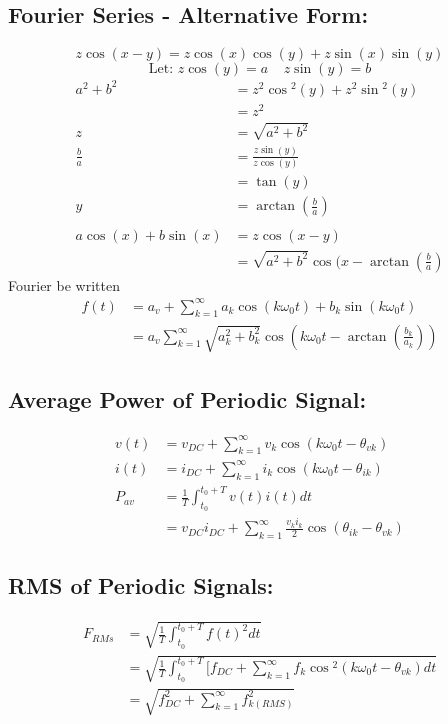 \documentclass[a5paper]{article}
\begin{document}
	\subsection{Fourier Series - Alternative Form:}
	$$z\cos{(x-y)}=z\cos{(x)}\cos{(y)}+z\sin{(x)}\sin{(y)}$$
	$$\text{Let: }z\cos{(y)}=a \;\;\;\; z\sin{(y)}=b$$
	\begin{align*}
		a^{2}+b^{2}&=z^{2}\cos{^{2}(y)}+z^{2}\sin{^{2}(y)}\\
		&=z^{2}\\
		z&=\sqrt{a^{2}+b^{2}}\\
		\frac{b}{a}&=\frac{z\sin{(y)}}{z\cos{(y)}}\\
		&=\tan{(y)}\\
		y&=\arctan{(\frac{b}{a})}\\\\
		a\cos{(x)}+b\sin{(x)}&=z\cos{(x-y)}\\
		&=\sqrt{a^{2}+b^{2}}\cos{(x-\arctan{(\frac{b}{a})}}
	\end{align*}
	Fourier be written
	\begin{align*}
		f(t)&=a_{v}+\sum^{\infty}_{k=1}a_{k}\cos{(k\omega_{0}t)}+b_{k}\sin{(k\omega_{0}t)}\\
		&=a_{v}\sum^{\infty}_{k=1}\sqrt{a_{k}^{2}+b_{k}^{2}}\cos{(k\omega_{0}t-\arctan{(\frac{b_{k}}{a_{k}})})}
	\end{align*}
	\subsection{Average Power of Periodic Signal:}
	\begin{align*}
		v(t)&=v_{DC}+\sum^{\infty}_{k=1}v_{k}\cos{(k\omega_{0}t-\theta_{vk})}\\
		i(t)&=i_{DC}+\sum^{\infty}_{k=1}i_{k}\cos{(k\omega_{0}t-\theta_{ik})}\\
		P_{av}&=\frac{1}{T}\int^{t_{0}+T}_{t_{0}}v(t)i(t)dt\\
		&=v_{DC}i_{DC}+\sum^{\infty}_{k=1}\frac{v_{k}i_{k}}{2}\cos{(\theta_{ik}-\theta_{vk})}
	\end{align*}
	\subsection{RMS of Periodic Signals:}
	\begin{align*}
		F_{RMs}&=\sqrt{\frac{1}{T}\int^{t_{0}+T}_{t_{0}}f(t)^{2}dt}\\
		&=\sqrt{\frac{1}{T}\int^{t_{0}+T}_{t_{0}}[f_{DC}+\sum^{\infty}_{k=1}f_{k}\cos{^{2}(k\omega_{0}t-\theta_{vk})}dt}\\
		&=\sqrt{f_{DC}^{2}+\sum^{\infty}_{k=1}f_{k(RMS)}^{2}}
	\end{align*}
\end{document}
